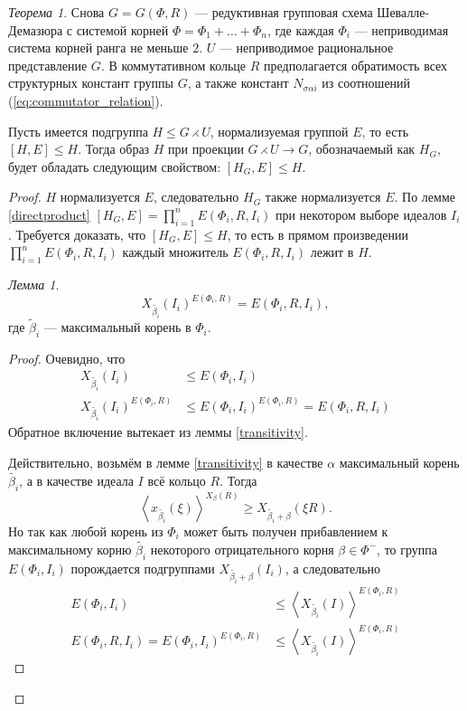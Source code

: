 \documentclass[10pt]{article}
\theoremstyle{remark}
\newtheorem{thm}{Теорема}
\newtheorem{lm}{Лемма}
\renewcommand{\le}{\leqslant}
\renewcommand{\ge}{\geqslant}
\begin{document}
\begin{thm}
  Снова $G = G(\Phi, R)$ --- редуктивная групповая схема Шевалле-Демазюра
  с системой корней $\Phi = \Phi_1 + \ldots + \Phi_n$, где каждая $\Phi_i$ --- неприводимая система корней ранга не меньше $2$. $U$ --- неприводимое рациональное представление $G$. В коммутативном кольце $R$ предполагается обратимость всех структурных констант группы $G$, а также констант $N_{\sigma\alpha i}$ из соотношений (\ref{eq:commutator_relation}).
    
  Пусть имеется подгруппа $H \le G \rightthreetimes U$, нормализуемая группой $E$, то есть $[H,E] \le H$. Тогда образ $H$ при проекции $G \rightthreetimes U \rightarrow G$, обозначаемый как $H_G$, будет обладать следующим свойством: $[H_G,E]\le H$.
\end{thm}
\begin{proof}
  $H$ нормализуется $E$, следовательно $H_G$ также нормализуется $E$. По лемме \ref{directproduct} $[H_G,E] = \prod_{i=1}^n E(\Phi_i,R,I_i)$ при некотором выборе идеалов $I_i$. Требуется доказать, что $[H_G,E] \le H$, то есть в прямом произведении $\prod_{i=1}^n E(\Phi_i,R,I_i)$ каждый множитель $E(\Phi_i,R,I_i)$  лежит в $H$.
  
\begin{lm}
  $$X_{\widetilde{\beta_i}}(I_i)^{E(\Phi_i,R)} = E(\Phi_i,R,I_i),$$
  где $\widetilde{\beta}_i$ --- максимальный корень в $\Phi_i$.
\end{lm}
\begin{proof}
  Очевидно, что
\begin{align*}
  X_{\widetilde{\beta_i}}(I_i) &\le E(\Phi_i,I_i) \\
  X_{\widetilde{\beta_i}}(I_i)^{E(\Phi_i,R)} &\le E(\Phi_i,I_i)^{E(\Phi_i,R)} = E(\Phi_i,R,I_i)
\end{align*}
  Обратное включение вытекает из леммы \ref{transitivity}.
  
  Действительно, возьмём в лемме \ref{transitivity} в качестве $\alpha$ максимальный корень $\widetilde{\beta_i}$, а в качестве идеала $I$ всё кольцо $R$. Тогда
  $$ \left< x_{\widetilde{\beta_i}}(\xi) \right>^{X_\beta(R)} \ge X_{\widetilde{\beta_i} + \beta}(\xi R). $$
  Но так как любой корень из $\Phi_i$ может быть получен прибавлением к максимальному корню $\widetilde{\beta_i}$ некоторого отрицательного корня $\beta \in \Phi^-$, то группа $E(\Phi_i,I_i)$ порождается подгруппами $X_{\widetilde{\beta_i} + \beta}(I_i)$, а следовательно 
\begin{align*}
E(\Phi_i,I_i) &\le \left< X_{\widetilde{\beta_i}}(I) \right>^{E(\Phi_i,R)}\\
  E(\Phi_i,R,I_i) = E(\Phi_i,I_i)^{E(\Phi_i,R)} &\le \left< X_{\widetilde{\beta_i}}(I) \right>^{E(\Phi_i,R)}
\end{align*}
\end{proof}


\end{proof}
\end{document}
